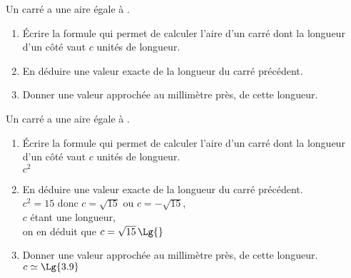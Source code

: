 \begin{exercice*}
    Un carré a une aire égale à .
    \begin{enumerate}
        \item Écrire la formule qui permet de calculer l'aire d'un carré dont la longueur d'un côté vaut $c$ unités de longueur.
        \item En déduire une valeur exacte de la longueur du carré précédent.
        \item Donner une valeur approchée au millimètre près, de cette longueur.
    \end{enumerate}
\end{exercice*}
\begin{corrige}
    Un carré a une aire égale à .

    \begin{enumerate}
        \item Écrire la formule qui permet de calculer l'aire d'un carré dont la longueur d'un côté vaut $c$ unités de longueur.\\
        {\red $c^2$}        
        \item En déduire une valeur exacte de la longueur du carré précédent.\\
        {\red $c^2=15$ donc $c=\sqrt{15}$ ou $c=-\sqrt{15}$,\\ $c$ étant une longueur,\\ on en déduit que $c=\sqrt{15}\,\Lg{}$}
        \item Donner une valeur approchée au millimètre près, de cette longueur.\\
        {\red $c\simeq \Lg{3.9}$}
    \end{enumerate}
\end{corrige}

